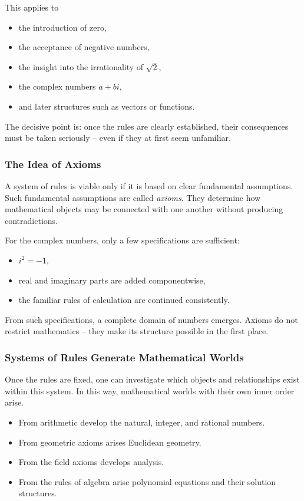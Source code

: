 This applies to
\begin{itemize}
	\item the introduction of zero,
	\item the acceptance of negative numbers,
	\item the insight into the irrationality of $\sqrt{2}$,
	\item the complex numbers \(a+bi\),
	\item and later structures such as vectors or functions.
\end{itemize}

The decisive point is:
once the rules are clearly established,
their consequences must be taken seriously --
even if they at first seem unfamiliar.

\subsubsection*{The Idea of Axioms}
A system of rules is viable only
if it is based on clear fundamental assumptions.
Such fundamental assumptions are called \emph{axioms}.
They determine
how mathematical objects may be connected with one another
without producing contradictions.

For the complex numbers, only a few specifications are sufficient:
\begin{itemize}
	\item \(i^2 = -1\),
	\item real and imaginary parts are added componentwise,
	\item the familiar rules of calculation are continued consistently.
\end{itemize}

From such specifications, a complete domain of numbers emerges.
Axioms do not restrict mathematics --
they make its structure possible in the first place.

\subsubsection*{Systems of Rules Generate Mathematical Worlds}
Once the rules are fixed,
one can investigate
which objects and relationships exist within this system.
In this way, mathematical worlds with their own inner order arise.

\begin{itemize}
	\item From arithmetic develop the natural, integer, and rational numbers.
	\item From geometric axioms arises Euclidean geometry.
	\item From the field axioms develops analysis.
	\item From the rules of algebra arise polynomial equations and their solution structures.
\end{itemize}

